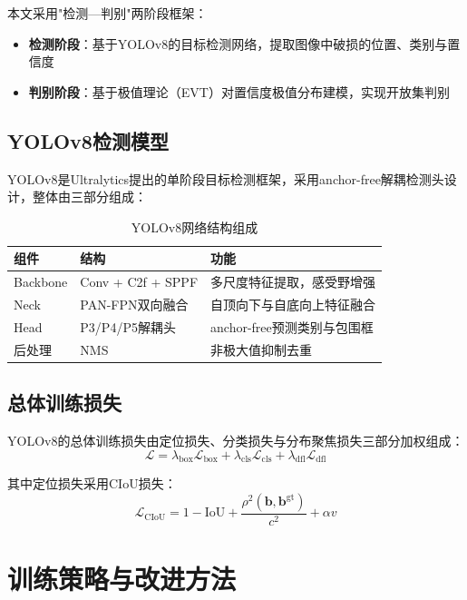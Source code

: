 \documentclass[12pt,a4paper]{ctexart}
\theoremstyle{cumcm}
\begin{document}
本文采用"检测—判别"两阶段框架：
\begin{itemize}
\item \textbf{检测阶段}：基于YOLOv8的目标检测网络，提取图像中破损的位置、类别与置信度
\item \textbf{判别阶段}：基于极值理论（EVT）对置信度极值分布建模，实现开放集判别
\end{itemize}

\subsection{YOLOv8检测模型}

YOLOv8是Ultralytics提出的单阶段目标检测框架，采用anchor-free解耦检测头设计，整体由三部分组成：

\begin{table}[H]
\centering
{}
\caption{YOLOv8网络结构组成}
\begin{tabular}{lll}
\toprule
\textbf{组件} & \textbf{结构} & \textbf{功能} \\
\midrule
Backbone & Conv + C2f + SPPF & 多尺度特征提取，感受野增强 \\
Neck & PAN-FPN双向融合 & 自顶向下与自底向上特征融合 \\
Head & P3/P4/P5解耦头 & anchor-free预测类别与包围框 \\
后处理 & NMS & 非极大值抑制去重 \\
\bottomrule
\end{tabular}
\end{table}

\subsection{总体训练损失}

YOLOv8的总体训练损失由定位损失、分类损失与分布聚焦损失三部分加权组成：
\begin{equation}
\mathcal{L} = \lambda_{\mathrm{box}}\mathcal{L}_{\mathrm{box}}
            + \lambda_{\mathrm{cls}}\mathcal{L}_{\mathrm{cls}}
            + \lambda_{\mathrm{dfl}}\mathcal{L}_{\mathrm{dfl}}
\end{equation}

其中定位损失采用CIoU损失：
\begin{equation}
\mathcal{L}_{\mathrm{CIoU}} = 1 - \mathrm{IoU}
+ \frac{\rho^{2}(\bm{b},\bm{b}^{\mathrm{gt}})}{c^{2}} + \alpha v
\end{equation}

\section{训练策略与改进方法}
\end{document}
